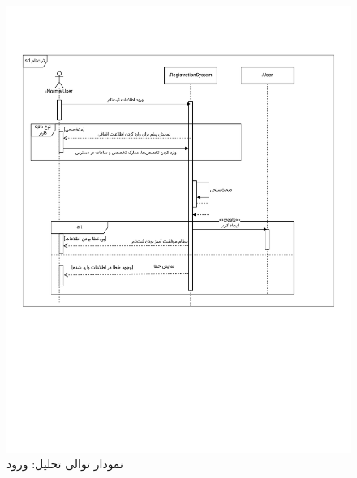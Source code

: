 \begin{figure}[ht!]
	\centering
	\includegraphics[scale=0.8, page=2]{figs/OOD-Sequence-1.pdf}
	\caption{نمودار توالی تحلیل: ورود}
\end{figure}
\FloatBarrier
\newpage

